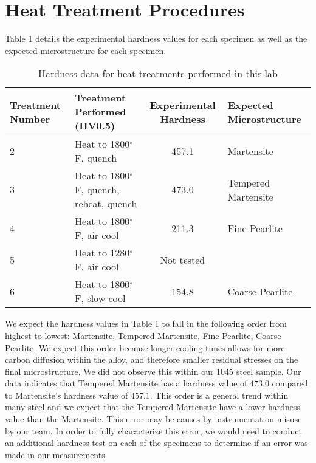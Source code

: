 \documentclass{article}
\newcommand{\degf}{$^\circ $F}
\begin{document}
\section{Heat Treatment Procedures}

Table \ref{tab:hardnessData} details the experimental hardness values for each specimen as well as the expected microstructure for each specimen.

\begin{table}[H]
\centering
\begin{tabular}{|p{1.5cm}|p{2.5cm}|c|p{2cm}|}
\hline
Treatment Number & Treatment Performed (HV0.5) & Experimental Hardness & Expected Microstructure \\
\hline
2 & Heat to 1800\degf, quench & 457.1 & Martensite \\
3 & Heat to 1800\degf, quench, reheat, quench & 473.0 & Tempered Martensite \\
4 & Heat to 1800\degf, air cool & 211.3 & Fine Pearlite \\
5 & Heat to 1280\degf, air cool & Not tested & \\
6 & Heat to 1800\degf, slow cool & 154.8 & Coarse Pearlite \\
\hline
\end{tabular}
\caption{Hardness data for heat treatments performed in this lab}
\label{tab:hardnessData}
\end{table}

We expect the hardness values in Table \ref{tab:hardnessData} to fall in the following order from highest to lowest: Martensite, Tempered Martensite, Fine Pearlite, Coarse Pearlite. \cite{book} We expect this order because longer cooling times allows for more carbon diffusion within the alloy, and therefore smaller residual stresses on the final microstructure. We did not observe this within our 1045 steel sample. Our data indicates that Tempered Martensite has a hardness value of $473.0$ compared to Martensite's hardness value of $457.1$. This order is a general trend within many steel and we expect that the Tempered Martensite have a lower hardness value than the Martensite. This error may be causes by instrumentation misuse by our team. In order to fully characterize this error, we would need to conduct an additional hardness test on each of the specimens to determine if an error was made in our measurements.
\end{document}
